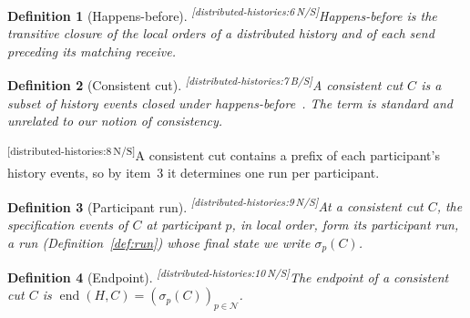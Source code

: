 \documentclass[sigconf]{cidr-2027}
\newtheorem{definition}{Definition}
\theoremstyle{remark}
\newcommand{\cxtag}[2]{\textsuperscript{\textsf{\tiny[#1\,#2]}}}
\begin{document}
\color{black}\begin{definition}[Happens-before]
\label{def:happens-before}
\cxtag{distributed-histories:6}{N/S}\emph{Happens-before} is the transitive closure of the local orders of a
distributed history and of each send preceding its matching receive.\color{black}
\end{definition}

\color{blue!75!black}\begin{definition}[Consistent cut]
\label{def:consistent-cut}
\cxtag{distributed-histories:7}{B/S}A \emph{consistent cut} $C$ is a subset of history events closed under happens-before~\cite{lamport1978time,chandy1985distributed}.  The term is standard and unrelated to our notion of consistency.\color{black}
\end{definition}

\color{black}\cxtag{distributed-histories:8}{N/S}A consistent cut contains a prefix of each participant's history events, so by
item~3
it determines one run per participant.\color{black}

\color{black}\begin{definition}[Participant run]
\label{def:participant-run}
\cxtag{distributed-histories:9}{N/S}At a consistent cut $C$, the specification events of $C$ at participant $p$,
in local order, form its \emph{participant run}, a run
(Definition~\ref{def:run}) whose final state we write $\sigma_p(C)$.\color{black}
\end{definition}

\color{black}\begin{definition}[Endpoint]
\label{def:endpoint}
\cxtag{distributed-histories:10}{N/S}The \emph{endpoint} of a consistent cut $C$ is
$\operatorname{end}(H,C)=(\sigma_p(C))_{p\in\mathcal N}$.\color{black}
\end{definition}
\end{document}
